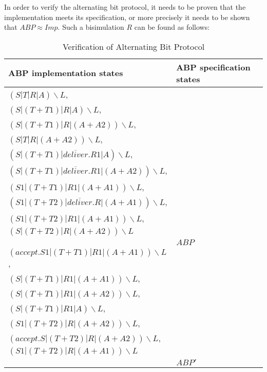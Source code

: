 In order to verify the alternating bit protocol, it needs to be proven that the
implementation meets its specification, or more precisely it needs to be shown
that $ABP\approx Imp$. Such a bisimulation $R$ can be found as follows:

\begin{table}
\begin{tabular}{| p{6.5cm} | p{3.5cm} | }
	
  \hline                       
	ABP implementation states &
	ABP specification states
	\\ \hline
	
$\left(S|T|R|A\right)\backslash L$,\\
$\left(S|\left(T+T1\right)|R|A\right)\backslash L$,\\
$\left(S|\left(T+T1\right)|R|\left(A+A2\right)\right)\backslash L$,\\
$\left(S|T|R|\left(A+A2\right)\right)\backslash L$,\\
$\left(S|\left(T+T1\right)|\overline{deliver}.R1|A\right)\backslash L$,\\
$\left(S|\left(T+T1\right)|\overline{deliver}.R1|\left(A+A2\right)\right)\backslash L$,\\
$\left(S1|\left(T+T1\right)|R1|\left(A+A1\right)\right)\backslash L$,\\
$\left(S1|\left(T+T2\right)|\overline{deliver}.R|\left(A+A1\right)\right)\backslash L$,\\
$\left(S1|\left(T+T2\right)|R1|\left(A+A1\right)\right)\backslash L$,\\
$\left(S|\left(T+T2\right)|R|\left(A+A2\right)\right)\backslash L$\\ &
  $ABP$   
  \\ \hline
   
$\left(accept.S1|\left(T+T1\right)|R1|\left(A+A1\right)\right)\backslash L$,\\ 
$\left(S|\left(T+T1\right)|R1|\left(A+A1\right)\right)\backslash L$,\\
$\left(S|\left(T+T1\right)|R1|\left(A+A2\right)\right)\backslash L$,\\
$\left(S|\left(T+T1\right)|R1|A\right)\backslash L$,\\
$\left(S1|\left(T+T2\right)|R|\left(A+A2\right)\right)\backslash L$,\\
$\left(accept.S|\left(T+T2\right)|R|\left(A+A2\right)\right)\backslash L$,\\
$\left(S1|\left(T+T2\right)|R|\left(A+A1\right)\right)\backslash L$\\ &
  $ABP'$
  \\ \hline  
\end{tabular}
\\
\caption{Verification of Alternating Bit Protocol}
\label{table3}
\end{table}
